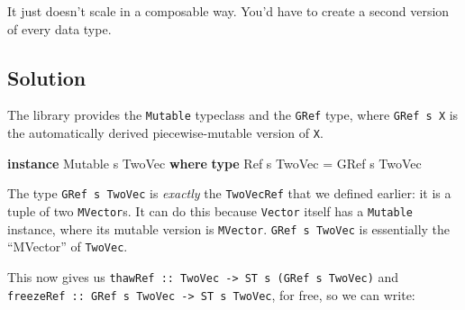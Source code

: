 \documentclass[]{article}
\newenvironment{Shaded}{}{}
\newcommand{\DataTypeTok}[1]{\textcolor[rgb]{0.56,0.13,0.00}{#1}}
\newcommand{\KeywordTok}[1]{\textcolor[rgb]{0.00,0.44,0.13}{\textbf{#1}}}
\newcommand{\NormalTok}[1]{#1}
\newcommand{\OperatorTok}[1]{\textcolor[rgb]{0.40,0.40,0.40}{#1}}
\newcommand{\OtherTok}[1]{\textcolor[rgb]{0.00,0.44,0.13}{#1}}
\begin{document}
\begin{Shaded}
\end{Shaded}

It just doesn't scale in a composable way. You'd have to create a second version
of every data type.

\subsection{Solution}\label{solution}

The library provides the \texttt{Mutable} typeclass and the \texttt{GRef} type,
where \texttt{GRef\ s\ X} is the automatically derived piecewise-mutable version
of \texttt{X}.

\begin{Shaded}
\begin{Highlighting}[]
\KeywordTok{instance} \DataTypeTok{Mutable}\NormalTok{ s }\DataTypeTok{TwoVec} \KeywordTok{where}
    \KeywordTok{type} \DataTypeTok{Ref}\NormalTok{ s }\DataTypeTok{TwoVec} \OtherTok{=} \DataTypeTok{GRef}\NormalTok{ s }\DataTypeTok{TwoVec}
\end{Highlighting}
\end{Shaded}

The type \texttt{GRef\ s\ TwoVec} is \emph{exactly} the \texttt{TwoVecRef} that
we defined earlier: it is a tuple of two \texttt{MVector}s. It can do this
because \texttt{Vector} itself has a \texttt{Mutable} instance, where its
mutable version is \texttt{MVector}. \texttt{GRef\ s\ TwoVec} is essentially the
``MVector'' of \texttt{TwoVec}.

This now gives us
\texttt{thawRef\ ::\ TwoVec\ -\textgreater{}\ ST\ s\ (GRef\ s\ TwoVec)} and
\texttt{freezeRef\ ::\ GRef\ s\ TwoVec\ -\textgreater{}\ ST\ s\ TwoVec}, for
free, so we can write:
\end{document}
